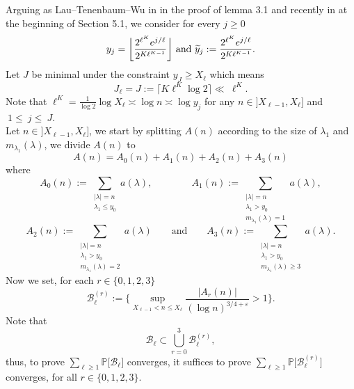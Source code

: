 \documentclass{article}
\begin{document}
Arguing as Lau--Tenenbaum--Wu in \cite{Tenenbaum} in the proof of lemma 3.1 and recently in \cite{Rachid} at the beginning of Section 5.1, we consider for every $j\geqslant 0 $
$$
y_j=\bigg\lfloor\frac{2^{\ell^K}{\rm e}^{j/\ell}}{2^{K\ell^{K-1}}}\bigg\rfloor \text{ and } \widetilde{y}_j:= \frac{2^{\ell^K}{\rm e}^{j/\ell}}{2^{K\ell^{K-1}}}.
$$
Let $J$ be minimal under the constraint $y_J \geqslant   X_{\ell}$ which means 
\begin{equation}\label{definition_J}
    J_{\ell}=J:=\lceil K \ell^{K} \log 2 \rceil \ll ~\ell^{K}.
\end{equation}
Note that  $\ell^{K} =\frac{1}{\log 2} \log X_{\ell} \asymp  \log n \asymp \log y_j $ for any $n \in ]X_{\ell -1},X_{\ell}]$ and~$~1\leqslant~  j\leqslant ~J$. \\
Let $n \in ]X_{\ell -1},X_{\ell}]$, we start by splitting $A(n)$ according to the size of $\lambda_1$ and $m_{\lambda_1}(\lambda)$, we divide $A(n)$ to 
$$
A(n) = A_0(n)+ A_1(n) +A_2(n)+ A_3(n)
$$
where
$$
 A_0(n):= \sum_{\substack{|\lambda|=n \\ \lambda_1 \leqslant y_0}} a(\lambda), \qquad\qquad 
A_1(n) :=\sum_{\substack{|\lambda|=n \\ \lambda_1 > y_0 \\ m_{\lambda_1}(\lambda)=1}} a(\lambda),
$$
$$
A_2(n):= \sum_{\substack{|\lambda|=n \\ \lambda_1 > y_0\\ m_{\lambda_1}(\lambda)= 2}} a(\lambda)
\qquad \text{and}\qquad 
A_3(n):= \sum_{\substack{|\lambda|=n \\ \lambda_1 > y_0\\ m_{\lambda_1}(\lambda)\geqslant 3}} a(\lambda).
$$
Now we set, for each $r\in \{0,1,2,3\}$
$$
\mathcal{B}_{\ell}^{(r)}:=  \bigg\{ \sup_{X_{\ell  -1}<n\leqslant X_{\ell}}\frac{|A_r(n)|}{(\log n )^{3/4 + \varepsilon}}> 1  \bigg\}.
$$
Note that $$\mathcal{B}_{\ell} \subset \bigcup_{r=0}^3\mathcal{B}_{\ell}^{(r)},$$ thus, to prove $ \sum_{\ell \geqslant 1} \mathbb{P}\big[\mathcal{B}_{\ell}\big]$ converges, it suffices to prove $ \sum_{\ell \geqslant 1} \mathbb{P}\big[\mathcal{B}_{\ell}^{(r)}\big]$ converges, for all $r\in\{0,1,2,3\}$.
\end{document}
